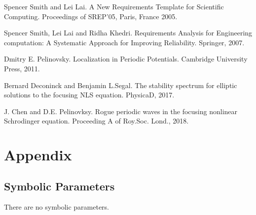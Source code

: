 \documentclass[12pt]{article}
\begin{document}

\clearpage 
\begin{thebibliography}{9} 
	Spencer Smith and Lei Lai. 
	A New Requirements Template for Scientific Computing. 
	Proceedings of SREP'05, Paris, France 2005. 
	
	Spencer Smith, Lei Lai and Ridha Khedri. 
	Requirements Analysis for Engineering computation: A Systematic Approach 
	for Improving Reliability. 
	Springer, 2007. 
	
	Dmitry E. Pelinovsky. 
	Localization in Periodic Potentials. 
	Cambridge University Press, 2011. 
	
	Bernard Deconinck and Benjamin L.Segal. 
	The stability spectrum for elliptic solutions to the focusing NLS equation. 
	PhysicaD, 2017.  
	
	J. Chen and D.E. Pelinovksy. 
	Rogue periodic waves in the focusing nonlinear Schrodinger equation. 
	Proceeding A of Roy.Soc. Lond., 2018. 
	
\end{thebibliography} 

\newpage

\section{Appendix}

\subsection{Symbolic Parameters}

There are no symbolic parameters.
\end{document}
